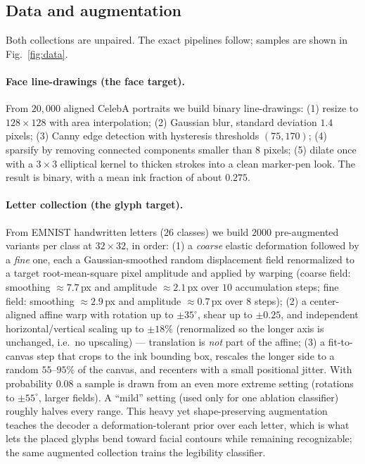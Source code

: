 \documentclass{article}
\begin{document}
\subsection{Data and augmentation}
\label{sec:data}
Both collections are unpaired. The exact pipelines follow; samples are shown in Fig.~\ref{fig:data}.

\paragraph{Face line-drawings (the face target).} From $20{,}000$ aligned CelebA \citep{liu2015celeba}
portraits we build binary line-drawings: (1) resize to $128{\times}128$ with area interpolation; (2)
Gaussian blur, standard deviation $1.4$ pixels; (3) Canny edge detection \citep{canny1986} with
hysteresis thresholds $(75,170)$; (4) sparsify by removing connected components smaller than $8$
pixels; (5) dilate once with a $3{\times}3$ elliptical kernel to thicken strokes into a clean
marker-pen look. The result is binary, with a mean ink fraction of about $0.275$.

\paragraph{Letter collection (the glyph target).} From EMNIST \citep{cohen2017emnist} handwritten
letters ($26$ classes) we build $2000$ pre-augmented variants per class at $32{\times}32$, in order:
(1) a \emph{coarse} elastic deformation \citep{simard2003elastic} followed by a \emph{fine} one, each a
Gaussian-smoothed random displacement field renormalized to a target root-mean-square pixel amplitude
and applied by warping
(coarse field: smoothing $\approx7.7$\,px and amplitude $\approx2.1$\,px over $10$ accumulation steps;
fine field: smoothing $\approx2.9$\,px and amplitude $\approx0.7$\,px over $8$ steps); (2) a
center-aligned affine warp with rotation up to $\pm35^\circ$, shear up to $\pm0.25$, and independent
horizontal/vertical scaling up to $\pm18\%$ (renormalized so the longer axis is unchanged, i.e.\ no
upscaling) --- translation is \emph{not} part of the affine; (3) a fit-to-canvas step that crops to the
ink bounding box, rescales the longer side to a random $55\text{--}95\%$ of the canvas, and recenters
with a small positional jitter. With probability $0.08$ a sample is drawn from an even more extreme
setting (rotations to $\pm55^\circ$, larger fields). A ``mild'' setting (used only for one ablation
classifier) roughly halves every range. This heavy yet shape-preserving augmentation teaches the
decoder a deformation-tolerant prior over each letter, which is what lets the placed glyphs bend toward
facial contours while remaining recognizable; the same augmented collection trains the legibility
classifier.
\end{document}
